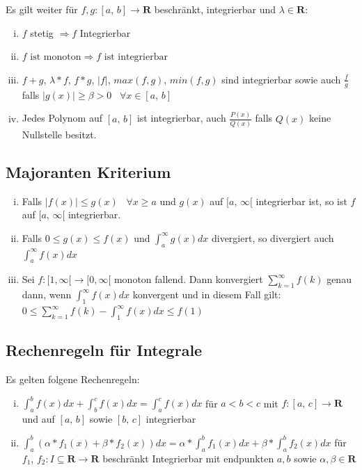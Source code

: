 \documentclass[8pt]{article}
\begin{document}
\begin{multicols*}{3}
Es gilt weiter für $f,g:[a,\,b] \rightarrow \mathbf{R}$ beschränkt, integrierbar und $\lambda \in \mathbf{R}$:
\begin{enumerate}[(i)]
  \item $f$ stetig $\Rightarrow f$ Integrierbar
  \item $f\text{ ist monoton} \Rightarrow f \text{ ist integrierbar}$
  \item $f + g$, $\lambda * f$, $f * g$, $|f|$, $max(f, g)$, $min(f, g)$ sind integrierbar sowie auch $\frac{f}{g}$ falls $|g(x)| \geq \beta > 0 \;\;\; \forall x \in [a,\,b]$
  \item Jedes Polynom auf $[a,\, b]$ ist integrierbar, auch $\frac{P(x)}{Q(x)}$ falls $Q(x)$ keine Nullstelle besitzt.
\end{enumerate}

\subsection{Majoranten Kriterium}

\begin{enumerate}[(i)]
  \item Falls $|f(x)| \leq g(x) \;\;\; \forall x \geq a$ und $g(x)$ auf $[a,\,\infty[$ integrierbar ist, so ist $f$ auf $[a,\,\infty[$ integrierbar.
  \item Falls $0 \leq g(x) \leq f(x)$ und $\int_a^\infty g(x) dx$ divergiert, so divergiert auch $\int_a^\infty f(x) dx$
  \item Sei $f:[1, \infty[ \rightarrow [0, \infty[$ monoton fallend. Dann konvergiert $\sum_{k = 1}^\infty f(k)$ genau dann, wenn $\int_1^\infty f(x) dx$ konvergent und in diesem
  Fall gilt: $0 \leq \sum_{k = 1}^\infty f(k) - \int_1^\infty f(x) dx \leq f(1)$
\end{enumerate}

\subsection{Rechenregeln für Integrale}

Es gelten folgene Rechenregeln:
\begin{enumerate}[(i)]
  \item $\int_a^b f(x) dx + \int_b^c f(x) dx = \int_a^c f(x) dx $ für $a < b < c$ mit $f:[a,\,c] \rightarrow \mathbf{R}$ und auf $[a,\,b]$ sowie $[b,\,c]$ integrierbar
  \item $\int_a^b(\alpha * f_1(x) + \beta * f_2(x)) dx = \alpha * \int_a^b f_1(x) dx + \beta * \int_a^b f_2(x) dx$ für $f_1$, $f_2: I \subseteq \mathbf{R} \rightarrow \mathbf{R}$ beschränkt Integrierbar mit endpunkten $a, b$ sowie $\alpha, \beta \in \mathbf{R}$
\end{enumerate}


\end{multicols*}
\end{document}
